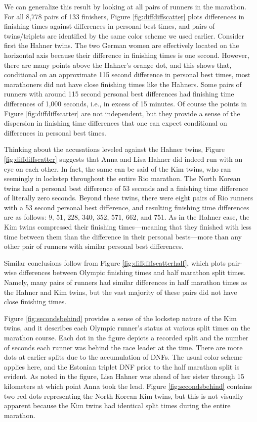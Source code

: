 \documentclass[12pt,titlepage]{article}
\begin{document}
We can generalize this result by looking at all pairs of runners in
the marathon.  For all 8,778 pairs of 133 finishers, Figure
\ref{fig:diffdiffscatter} plots differences in finishing times against
differences in personal best times, and pairs of twins/triplets are
identified by the same color scheme we used earlier.  Consider first
the Hahner twins.  The two German women are effectively located on the
horizontal axis because their difference in finishing times is one
second.  However, there are many points above the Hahner's orange dot,
and this shows that, conditional on an approximate 115 second
difference in personal best times, most marathoners did not have close
finishing times like the Hahners.  Some pairs of runners with around
115 second personal best differences had finishing time differences of
1,000 seconds, i.e., in excess of 15 minutes.  Of course the points in
Figure \ref{fig:diffdiffscatter} are not independent, but they provide
a sense of the dispersion in finishing time differences that one can
expect conditional on differences in personal best times.

Thinking about the accusations leveled against the Hahner twins,
Figure \ref{fig:diffdiffscatter} suggests that Anna and Lisa Hahner
did indeed run with an eye on each other.  In fact, the same can be
said of the Kim twins, who ran seemingly in lockstep throughout the
entire Rio marathon.  The North Korean twins had a personal best
difference of 53 seconds and a finishing time difference of literally
zero seconds.  Beyond these twins, there were eight pairs of Rio
runners with a 53 second personal best difference, and resulting
finishing time differences are as follows: 9, 51, 228, 340, 352, 571,
662, and 751.  As in the Hahner case, the Kim twins compressed their
finishing times---meaning that they finished with less time between
them than the difference in their personal bests---more than any other
pair of runners with similar personal best differences.

Similar conclusions follow from Figure \ref{fig:diffdiffscatterhalf},
which plots pair-wise differences between Olympic finishing times and
half marathon split times.  Namely, many pairs of runners had similar
differences in half marathon times as the Hahner and Kim twins, but
the vast majority of these pairs did not have close finishing times.

Figure \ref{fig:secondsbehind} provides a sense of the lockstep nature
of the Kim twins, and it describes each Olympic runner's status at
various split times on the marathon course.  Each dot in the figure
depicts a recorded split and the number of seconds each runner was
behind the race leader at the time.  There are more dots at earlier
splits due to the accumulation of DNFs.  The usual color scheme
applies here, and the Estonian triplet DNF prior to the half marathon
split is evident. As noted in the figure, Lisa Hahner was ahead of her
sister through 15 kilometers at which point Anna took the lead.
Figure \ref{fig:secondsbehind} contains two red dots representing the
North Korean Kim twins, but this is not visually apparent because the
Kim twins had identical split times during the entire marathon.
\end{document}
